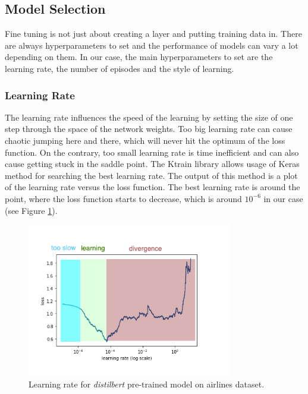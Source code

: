 \subsection{Model Selection}
\label{sec:Model_selection}

Fine tuning is not just about creating a layer and putting training data in. There are always hyperparameters to set and the performance of models can vary a lot depending on them. In our case, the main hyperparameters to set are the learning rate, the number of episodes and the style of learning.
\subsubsection{Learning Rate}

The learning rate influences the speed of the learning by setting the size of one step through the space of the network weights. Too big learning rate can cause chaotic jumping here and there, which will never hit the optimum of the loss function. On the contrary,  too small learning rate is time inefficient and can also cause getting stuck in the saddle point. The Ktrain library allows usage of Keras method for searching the best learning rate. The output of this method is a plot of the learning rate versus the loss function. The best learning rate is around the point, where the loss function starts to decrease, which is around $10^{-6}$ in our case (see Figure \ref{fig:figlearningrate}).
\begin{figure}
\centering
\includegraphics[width=0.8\textwidth]{diagrams/learning_rate2.png}
\caption{
Learning rate for \textit{distilbert} pre-trained model on airlines dataset.}
\label{fig:figlearningrate}
\end{figure}

